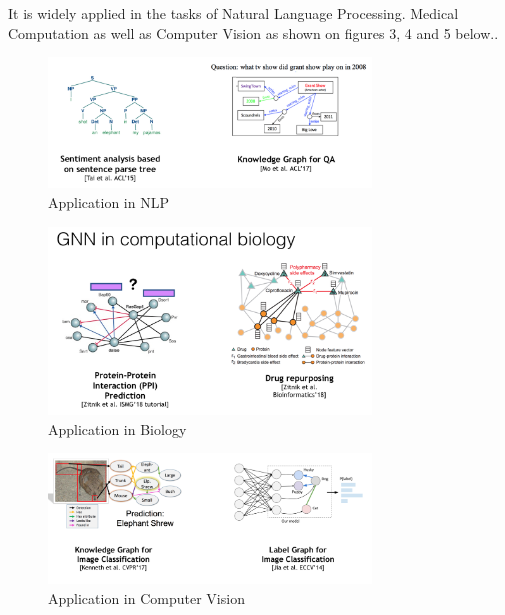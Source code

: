 It is widely applied in the tasks of Natural Language Processing. Medical Computation as well as Computer Vision as shown on figures 3, 4 and 5 below.. 
\begin{figure}[ht]
\begin{center}
  \includegraphics[width=3.38in]{labs/14/images/NLP.png}
\end{center}
   \caption{Application in NLP}
\label{fig:CV}
\end{figure}

\begin{figure}[ht]
\begin{center}
  \includegraphics[width=3.38in]{labs/14/images/Biology.png}
\end{center}
   \caption{Application in Biology}
\label{fig:CV}
\end{figure}

\begin{figure}[ht]
\begin{center}
  \includegraphics[width=3.38in]{labs/14/images/Computer_Vision.png}
\end{center}
   \caption{Application in Computer Vision}
\label{fig:CV}
\end{figure}



